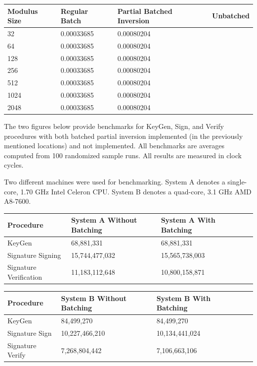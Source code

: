 \begin{center}
\begin{tabular}{@{}llll@{}}
	\toprule
	Modulus Size & Regular Batch & Partial Batched Inversion & Unbatched \\
	\midrule
	32 & 0.00033685 & 0.00080204\\
	64 & 0.00033685 & 0.00080204\\
	128 & 0.00033685 & 0.00080204\\
	256 & 0.00033685 & 0.00080204\\
	512 & 0.00033685 & 0.00080204\\
	1024 & 0.00033685 & 0.00080204\\
	2048 & 0.00033685 & 0.00080204\\
	\bottomrule
\end{tabular}
\end{center}

\noindent
The two figures below provide benchmarks for KeyGen, Sign, and Verify procedures with both batched partial inversion implemented (in the previously mentioned locations) and not implemented. All benchmarks are averages computed from 100 randomized sample runs. All results are measured in clock cycles.

Two different machines were used for benchmarking. System A denotes a single-core, 1.70 GHz Intel Celeron CPU. System B denotes a quad-core, 3.1 GHz AMD A8-7600.\\

\begin{center}
\begin{tabular}{@{}lllll@{}}
	\toprule
	Procedure & System A Without Batching & System A With Batching\\
	\midrule
	KeyGen & 68,881,331 & 68,881,331\\
	Signature Signing & 15,744,477,032 & 15,565,738,003\\
	Signature Verification & 11,183,112,648 & 10,800,158,871\\
	\bottomrule
\end{tabular}
\end{center}

\begin{center}
\begin{tabular}{@{}lllll@{}}
	\toprule
	Procedure & System B Without Batching & System B With Batching\\
	\midrule
	KeyGen & 84,499,270 & 84,499,270\\
	Signature Sign & 10,227,466,210 & 10,134,441,024\\
	Signature Verify & 7,268,804,442 & 7,106,663,106\\
	\bottomrule
\end{tabular}
\end{center}

